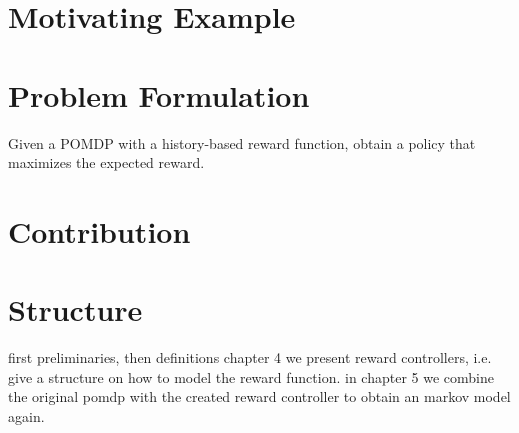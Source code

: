 \par
\section*{Motivating Example}

\section*{Problem Formulation}
Given a POMDP with a history-based reward function, obtain a policy that maximizes the expected reward.

\section*{Contribution}

\section*{Structure}
first preliminaries, then definitions 
chapter 4 we present reward controllers, i.e. give a structure on how to model the reward function. in chapter 5 we combine the original pomdp with the created reward controller to obtain an markov model again. 